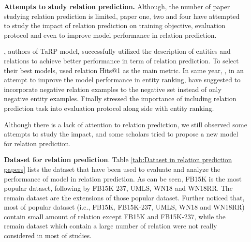 \noindent\textbf{Attempts to study relation prediction.} Although, the number of paper studying relation prediction is limited, paper one, two and four have attempted to study the impact of relation prediction on training objective, evaluation protocol and even to improve model performance in relation prediction. 

\citet{cui2021type}, authors of TaRP model, successfully utilized the description of entities and relations to achieve better performance in term of relation prediction. To select their best models, \citet{cui2021type} used relation Hits@1 as the main metric. In same year, \citet{chen2021relation}, in an attempt to improve the model performance in entity ranking, have suggested to incorporate negative relation examples to the negative set instead of only negative entity examples. Finally \citet{chang2020benchmark} stressed the importance of including relation prediction task into evaluation protocol along side with entity ranking. 

Although there is a lack of attention to relation prediction, we still observed some attempts to study the impact, and some scholars tried to propose a new model for relation prediction. 
\newline

\noindent\textbf{Dataset for relation prediction}. Table \ref{tab:Dataset in relation prediction papers} lists the dataset that have been used to evaluate and analyze the performance of model in relation prediction. As can be seen, FB15K is the most popular dataset, following by FB15K-237, UMLS, WN18 and WN18RR. The remain dataset are the extensions of those popular dataset. Further noticed that, most of popular dataset (i.e., FB15K, FB15K-237, UMLS, WN18 and WN18RR) contain small amount of relation except FB15K and FB15K-237, while the remain dataset which contain a large number of relation were not really considered in most of studies. 
\newline

